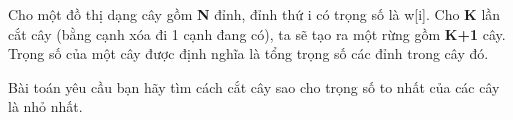 Cho một đồ thị dạng cây gồm   \textbf{    N   }   đỉnh, đỉnh thứ i có trọng số là w[i]. Cho   \textbf{    K   }   lần cắt cây (bằng cạnh xóa đi 1 cạnh đang có), ta sẽ tạo ra một rừng gồm   \textbf{    K+1   }   cây. Trọng số của một cây được định nghĩa là tổng trọng số các đỉnh trong cây đó.  

   Bài toán yêu cầu bạn hãy tìm cách cắt cây sao cho trọng số to nhất của các cây là nhỏ nhất.